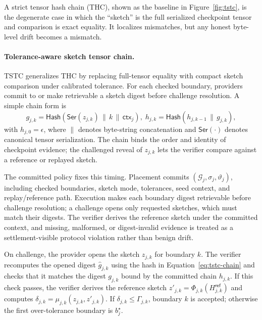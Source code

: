 \documentclass[sigplan,screen,review,anonymous]{acmart}
\begin{document}
A strict tensor hash chain (THC), shown as the baseline in
Figure~\ref{fig:tstc}, is the degenerate case in which the
``sketch'' is the full serialized checkpoint tensor and comparison is exact
equality. It localizes mismatches, but any honest byte-level drift becomes a
mismatch.

\paragraph{Tolerance-aware sketch tensor chain.}
TSTC generalizes THC by replacing full-tensor equality with compact sketch
comparison under calibrated tolerance. For each checked boundary, providers
commit to or make retrievable a sketch digest before challenge resolution. A
simple chain form is
\begin{equation}
g_{j,k}=\mathsf{Hash}(\mathsf{Ser}(z_{j,k})\,\|\,k\,\|\,\mathsf{ctx}_j),
\;
h_{j,k}=\mathsf{Hash}(h_{j,k-1}\,\|\,g_{j,k}),
\label{eq:tstc-chain}
\end{equation}
with \(h_{j,0}=\epsilon\), where \(\|\) denotes byte-string concatenation and
\(\mathsf{Ser}(\cdot)\) denotes canonical tensor serialization. The chain binds
the order and identity of checkpoint evidence; the challenged reveal of
\(z_{j,k}\) lets the verifier compare against a reference or replayed sketch.

The committed policy fixes this timing. Placement commits
\((\mathcal{G}_j,\sigma_j,\vartheta_j)\), including checked boundaries, sketch
mode, tolerances, seed context, and replay/reference path. Execution makes each
boundary digest retrievable before challenge resolution; a challenge opens only
requested sketches, which must match their digests. The verifier derives the
reference sketch under the committed context, and missing, malformed, or
digest-invalid evidence is treated as a settlement-visible protocol violation
rather than benign drift.

On challenge, the provider opens the sketch \(z_{j,k}\) for boundary \(k\).
The verifier recomputes the opened digest \(\hat{g}_{j,k}\) using the hash in
Equation~\ref{eq:tstc-chain} and checks that it matches the digest \(g_{j,k}\)
bound by the committed chain \(h_{j,k}\). If this check passes, the verifier
derives the reference sketch
\(z'_{j,k}=\Phi_{j,k}(H^{\mathsf{ref}}_{j,k})\) and computes
\(\delta_{j,k}=\mu_{j,k}(z_{j,k},z'_{j,k})\). If
\(\delta_{j,k}\le\Gamma_{j,k}\), boundary \(k\) is accepted; otherwise the first
over-tolerance boundary is \(b^\star_j\).
\end{document}

